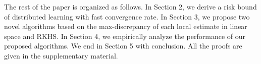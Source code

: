 \documentclass{article}
\newcommand{\argmin}{\operatornamewithlimits{arg\,min}}
\begin{document}
The rest of the paper is organized as follows.
In Section 2, we derive a risk bound of distributed learning with fast convergence rate.
In Section 3, we  propose two novel algorithms based on the max-discrepancy of each local estimate in linear space and RKHS.
In Section 4, we empirically analyze the performance of our proposed algorithms.
We end in Section 5 with conclusion.
All the proofs are given in the supplementary material.


%
%
%
\end{document}

